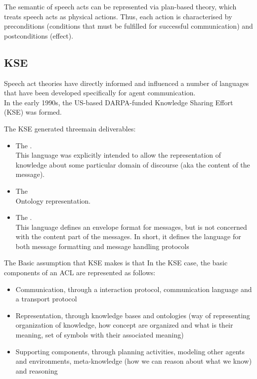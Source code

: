 The semantic of speech acts can be represented via plan-based theory, which treats speech acts as physical actions. Thus, each action is characterised by preconditions (conditions that must be fulfilled for successful communication) and postconditions (effect).

\subsection{KSE}
Speech act theories have directly informed and influenced a number of languages that have been developed specifically for agent communication.\\
In the early 1990s, the US-based DARPA-funded Knowledge Sharing Effort (KSE) was formed.

The KSE generated threemain deliverables:
\begin{itemize}
\item The .\\
This language was explicitly intended to allow the representation of knowledge about some particular domain of discourse (aka the content of the message).
\item The \\
Ontology representation.
\item The . \\
This language defines an envelope format for messages, but is not concerned with the content part of the messages.
In short, it defines the language for both message formatting and message handling protocols
\end{itemize}
The Basic assumption that KSE makes is that 
In the KSE case, the basic components of an ACL are represented as follows:
\begin{itemize}
\item Communication, through a interaction protocol, communication language and a transport protocol
\item Representation, through knowledge bases and ontologies (way of representing organization of knowledge, how concept are organized and what is their meaning, set of symbols with their associated meaning)
\item Supporting components, through planning activities, modeling other agents and environments, meta-knowledge (how we can reason about what we know) and reasoning
\end{itemize}
